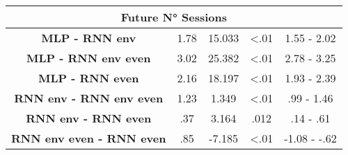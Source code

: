 \begin{table}[h]
\begin{tabular}{ccccc}
\multicolumn{5}{c}{\textbf{Future N° Sessions}}                                                                      \\ \hline
\textbf{MLP - RNN env} & 1.78                & 15.033     & \textless .01   & 1.55 - 2.02                    \\
\textbf{MLP - RNN env even}           & 3.02                & 25.382     & \textless .01   & 2.78 - 3.25                    \\
\textbf{MLP - RNN even}           & 2.16               & 18.197     & \textless .01   & 1.93 - 2.39                     \\
\textbf{RNN env - RNN env even}           & 1.23                & 1.349     & \textless .01   & .99 - 1.46                     \\
\textbf{RNN env - RNN even}           & .37                & 3.164     &   .012   & .14 - .61                     \\
\textbf{RNN env even - RNN even}          & .85                & -7.185     & \textless .01   & -1.08 - -.62                    \\ \hline

\end{tabular}
\end{table}